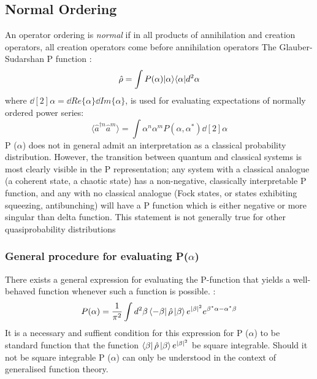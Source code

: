 \subsection{Normal Ordering}
An operator ordering is \emph{normal} if in all products of annihilation and creation operators, all creation operators come before annihilation operators \cite{Mandl2010} The Glauber-Sudarshan P function \cite{Cahill1969}:
\begin{equation}
	\hat{\rho} = \int P(\alpha) | \alpha \rangle \langle \alpha | d^2 \alpha
	\end{equation}
        where $\dd[2]{\alpha} = \dd{Re\{\alpha \}}\dd{Im\{\alpha \}}$, is used for evaluating expectations of normally ordered power series:
\begin{equation}
  \langle \hat{a}^{\dagger n} \hat{a}^{m}  \rangle = \int \alpha^n \alpha^m P (\alpha, \alpha^*) \dd[2]{\alpha}
\end{equation}
P ($\alpha$) does not in general admit an interpretation as a classical probability distribution.
However, the transition between quantum and classical systems is most clearly visible in the P representation; any system with a classical analogue (a coherent state, a chaotic state) has a non-negative, classically interpretable P function, and any with no classical analogue (Fock states, or states exhibiting squeezing, antibunching) will have a P function which is either negative or more singular than delta function.
This statement is not generally true for other quasiprobability distributions \cite{Mandel1995}
\subsubsection{General procedure for evaluating P($\alpha$)}\label{mehta}
There exists a general expression for evaluating the P-function that yields a well-behaved function whenever such a function is possible.
 \cite{Mehta1967}:
\begin{equation}
	P(\alpha) = \frac{1}{\pi^2} \int d^2 \beta \bra{-\beta} \hat{\rho} \ket{\beta} e^{|\beta|^2} e^{\beta^* \alpha -\alpha^* \beta}
\end{equation}
It is a necessary and suffient condition for this expression for P ($\alpha$) to be standard function that the function $ \bra{\beta} \hat{\rho} \ket{\beta} e^{|\beta|^2} $ be square integrable.
Should it not be square integrable P ($\alpha$) can only be understood in the context of generalised function theory.
